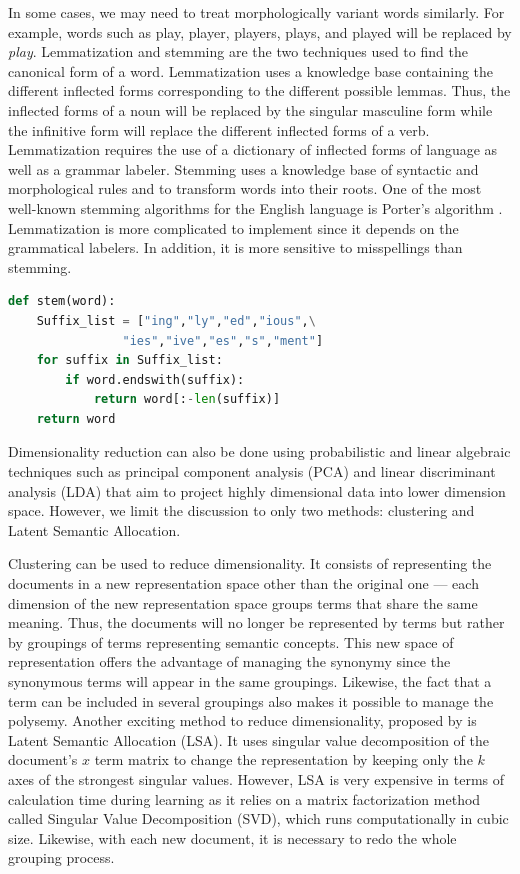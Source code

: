 In some cases, we may need to treat morphologically variant words similarly. For example, words such as play, player, players, plays, and played will be replaced by \emph{play}. Lemmatization and stemming are the two techniques used to find the canonical form of a word. Lemmatization uses a knowledge base containing the different inflected forms corresponding to the different possible lemmas. Thus, the inflected forms of a noun will be replaced by the singular masculine form while the infinitive form will replace the different inflected forms of a verb. Lemmatization requires the use of a dictionary of inflected forms of language as well as a grammar labeler. Stemming uses a knowledge base of syntactic and morphological rules and to transform words into their roots. One of the most well-known stemming algorithms for the English language is Porter's algorithm \citep{porter1980algorithm}. Lemmatization is more complicated to implement since it depends on the grammatical labelers. In addition, it is more sensitive to misspellings than stemming.

\begin{lstlisting}[language=Python, caption=An example of simple Stemmer Written in Python]
def stem(word):
    Suffix_list = ["ing","ly","ed","ious",\
                "ies","ive","es","s","ment"]
    for suffix in Suffix_list:
        if word.endswith(suffix):
            return word[:-len(suffix)]
    return word
\end{lstlisting}

Dimensionality reduction can also be done using probabilistic and linear algebraic techniques such as principal component analysis (PCA) and linear discriminant analysis (LDA) that aim to project highly dimensional data into lower dimension space. However, we limit the discussion to only two methods: clustering and Latent Semantic Allocation. 

Clustering \citep{baker1998distributional, sable2001using, slonim2001power} can be used to reduce dimensionality. It consists of representing the documents in a new representation space other than the original one — each dimension of the new representation space groups terms that share the same meaning. Thus, the documents will no longer be represented by terms but rather by groupings of terms representing semantic concepts. This new space of representation offers the advantage of managing the synonymy since the synonymous terms will appear in the same groupings. Likewise, the fact that a term can be included in several groupings also makes it possible to manage the polysemy. Another exciting method to reduce dimensionality, proposed by \cite{deerwester1990indexing} is Latent Semantic Allocation (LSA). It uses singular value decomposition of the document's $x$ term matrix to change the representation by keeping only the $k$ axes of the strongest singular values. However, LSA is very expensive in terms of calculation time during learning as it relies on a matrix factorization method called Singular Value Decomposition (SVD), which runs computationally in cubic size. Likewise, with each new document, it is necessary to redo the whole grouping process.

